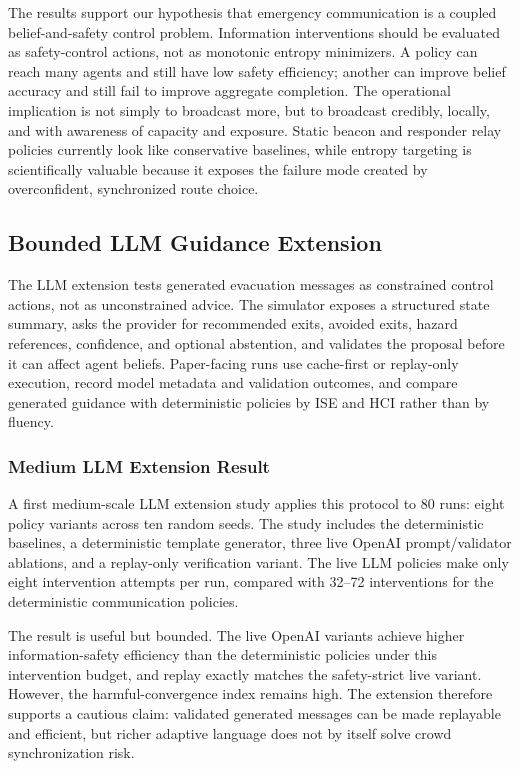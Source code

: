 The results support our hypothesis that emergency communication is a coupled
belief-and-safety control problem. Information interventions should be evaluated
as safety-control actions, not as monotonic entropy minimizers. A policy can
reach many agents and still have low safety efficiency; another can improve
belief accuracy and still fail to improve aggregate completion. The operational
implication is not simply to broadcast more, but to broadcast credibly, locally,
and with awareness of capacity and exposure. Static beacon and responder relay
policies currently look like conservative baselines, while entropy targeting is
scientifically valuable because it exposes the failure mode created by
overconfident, synchronized route choice.

\subsection{Bounded LLM Guidance Extension}
\label{subsec:llm-guidance-evaluation}

The LLM extension tests generated evacuation messages as constrained control
actions, not as unconstrained advice. The simulator exposes a structured state
summary, asks the provider for recommended exits, avoided exits, hazard
references, confidence, and optional abstention, and validates the proposal
before it can affect agent beliefs. Paper-facing runs use cache-first or
replay-only execution, record model metadata and validation outcomes, and
compare generated guidance with deterministic policies by ISE and HCI rather
than by fluency.

\subsubsection{Medium LLM Extension Result}
\label{subsec:llm-medium-result}

A first medium-scale LLM extension study applies this protocol to 80 runs:
eight policy variants across ten random seeds. The study includes the
deterministic baselines, a deterministic template generator, three live OpenAI
prompt/validator ablations, and a replay-only verification variant. The live
LLM policies make only eight intervention attempts per run, compared with
32--72 interventions for the deterministic communication policies.

\llmMediumTable

The result is useful but bounded. The live OpenAI variants achieve higher
information-safety efficiency than the deterministic policies under this
intervention budget, and replay exactly matches the safety-strict live
variant. However, the harmful-convergence index remains high. The extension
therefore supports a cautious claim: validated generated messages can be made
replayable and efficient, but richer adaptive language does not by itself
solve crowd synchronization risk.

